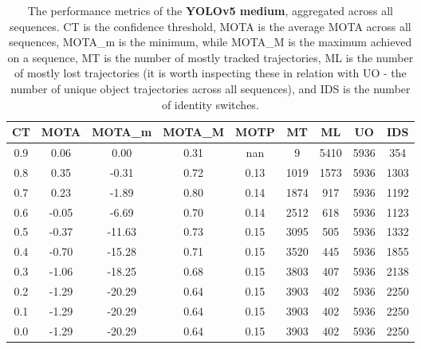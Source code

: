 \begin{table}[h]
    \centering
    \begin{tabular}{|c||c|c|c|c|c|c|c|c|}
        \hline
        CT & MOTA & MOTA\_m & MOTA\_M & MOTP & MT & ML & UO & IDS \\
        \hline
        \hline
        0.9 & 0.06 & 0.00 & 0.31 & nan & 9 & 5410 & 5936 & 354 \\
        \hline
        0.8 & 0.35 & -0.31 & 0.72 & 0.13 & 1019 & 1573 & 5936 & 1303 \\
        \hline 
        0.7 & 0.23 & -1.89 & 0.80 & 0.14 & 1874 & 917 & 5936 & 1192 \\
        \hline 
        0.6 & -0.05 & -6.69 & 0.70 & 0.14 & 2512 & 618 & 5936 & 1123 \\
        \hline 
        0.5 & -0.37 & -11.63 & 0.73 & 0.15 & 3095 & 505 & 5936 & 1332 \\
        \hline 
        0.4 & -0.70 & -15.28 & 0.71 & 0.15 & 3520 & 445 & 5936 & 1855 \\
        \hline 
        0.3 & -1.06 & -18.25 & 0.68 & 0.15 & 3803 & 407 & 5936 & 2138 \\
        \hline 
        0.2 & -1.29 & -20.29 & 0.64 & 0.15 & 3903 & 402 & 5936 & 2250 \\
        \hline 
        0.1 & -1.29 & -20.29 & 0.64 & 0.15 & 3903 & 402 & 5936 & 2250 \\
        \hline 
        0.0 & -1.29 & -20.29 & 0.64 & 0.15 & 3903 & 402 & 5936 & 2250 \\
        \hline
    \end{tabular}
    \caption{The performance metrics of the \textbf{YOLOv5 medium}, aggregated across all sequences. CT is the confidence threshold, MOTA is the average MOTA across all sequences, MOTA\_m is the minimum, while MOTA\_M is the maximum achieved on a sequence, MT is the number of mostly tracked trajectories, ML is the number of mostly lost trajectories (it is worth inspecting these in relation with UO - the number of unique object trajectories across all sequences), and IDS is the number of identity switches.}
    \label{tab:mota_ym}
\end{table}
